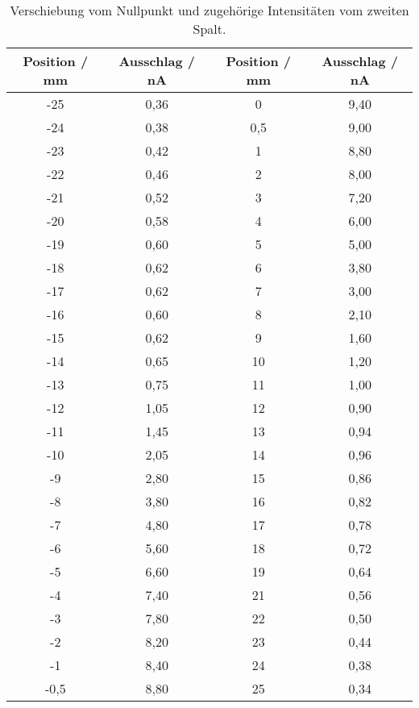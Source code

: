 \begin{table}[!htp]
\centering
\caption{Verschiebung vom Nullpunkt und zugehörige Intensitäten vom zweiten Spalt.}
\label{tab:spalt2}
\begin{tabular}{c c c c}
\toprule
{{Position / mm}} & {{Ausschlag / nA}}  & {{Position / mm}} & {{Ausschlag / nA}}\\
\midrule
-25 & 0,36 &0  & 9,40 \\ 
-24 & 0,38 &0,5& 9,00  \\
-23 & 0,42 & 1 & 8,80  \\
-22 & 0,46 & 2 & 8,00   \\
-21 & 0,52 & 3 & 7,20  \\
-20 & 0,58 & 4 & 6,00  \\
-19 & 0,60 & 5 & 5,00  \\
-18 & 0,62 & 6 & 3,80  \\
-17 & 0,62 & 7 & 3,00  \\
-16 & 0,60 & 8 & 2,10  \\
-15 & 0,62 & 9 & 1,60  \\
-14 & 0,65 &10 & 1,20  \\
-13 & 0,75 &11 & 1,00  \\
-12 & 1,05 &12 & 0,90  \\
-11 & 1,45 &13 & 0,94 \\
-10 & 2,05 &14 & 0,96 \\
-9  & 2,80  &15 & 0,86 \\
-8  & 3,80  &16 & 0,82 \\
-7  & 4,80  &17 & 0,78 \\
-6  & 5,60  &18 & 0,72 \\
-5  & 6,60  &19 & 0,64 \\
-4  & 7,40  &21 & 0,56 \\
-3  & 7,80  &22 & 0,50 \\
-2  & 8,20  &23 & 0,44 \\
-1  & 8,40  &24 & 0,38 \\
-0,5& 8,80  &25 & 0,34 \\
  




\bottomrule
\end{tabular}
\end{table}
